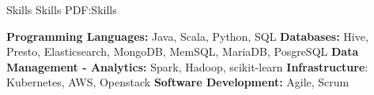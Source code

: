 
\Section
{Skills}
{Skills}
{PDF:Skills}

\Entry
\BulletItem
\textbf{Programming Languages: }Java, Scala, Python, SQL
\BulletItem
\textbf{Databases:} Hive, Presto, Elasticsearch, MongoDB, MemSQL, MariaDB, PosgreSQL
\BulletItem
\textbf{Data Management - Analytics:} Spark, Hadoop, scikit-learn
\BulletItem
\textbf{Infrastructure}: Kubernetes, AWS, Openstack
\BulletItem
\textbf{Software Development:} Agile, Scrum
